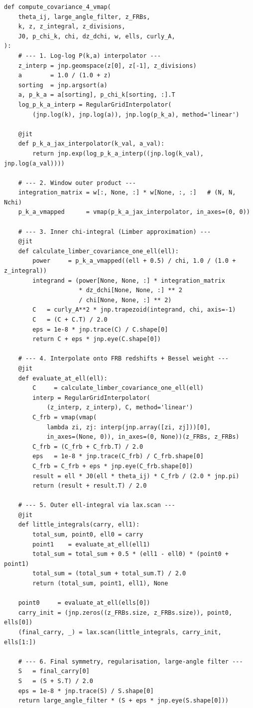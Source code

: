 \begin{lstlisting}[style=python, caption={Angular covariance via Limber approximation.}]
def compute_covariance_4_vmap(
    theta_ij, large_angle_filter, z_FRBs,
    k, z, z_integral, z_divisions,
    J0, p_chi_k, chi, dz_dchi, w, ells, curly_A,
):
    # --- 1. Log-log P(k,a) interpolator ---
    z_interp = jnp.geomspace(z[0], z[-1], z_divisions)
    a        = 1.0 / (1.0 + z)
    sorting  = jnp.argsort(a)
    a, p_k_a = a[sorting], p_chi_k[sorting, :].T
    log_p_k_a_interp = RegularGridInterpolator(
        (jnp.log(k), jnp.log(a)), jnp.log(p_k_a), method='linear')

    @jit
    def p_k_a_jax_interpolator(k_val, a_val):
        return jnp.exp(log_p_k_a_interp((jnp.log(k_val), jnp.log(a_val))))

    # --- 2. Window outer product ---
    integration_matrix = w[:, None, :] * w[None, :, :]   # (N, N, Nchi)
    p_k_a_vmapped      = vmap(p_k_a_jax_interpolator, in_axes=(0, 0))

    # --- 3. Inner chi-integral (Limber approximation) ---
    @jit
    def calculate_limber_covariance_one_ell(ell):
        power     = p_k_a_vmapped((ell + 0.5) / chi, 1.0 / (1.0 + z_integral))
        integrand = (power[None, None, :] * integration_matrix
                     * dz_dchi[None, None, :] ** 2
                     / chi[None, None, :] ** 2)
        C   = curly_A**2 * jnp.trapezoid(integrand, chi, axis=-1)
        C   = (C + C.T) / 2.0
        eps = 1e-8 * jnp.trace(C) / C.shape[0]
        return C + eps * jnp.eye(C.shape[0])

    # --- 4. Interpolate onto FRB redshifts + Bessel weight ---
    @jit
    def evaluate_at_ell(ell):
        C     = calculate_limber_covariance_one_ell(ell)
        interp = RegularGridInterpolator(
            (z_interp, z_interp), C, method='linear')
        C_frb = vmap(vmap(
            lambda zi, zj: interp(jnp.array([zi, zj]))[0],
            in_axes=(None, 0)), in_axes=(0, None))(z_FRBs, z_FRBs)
        C_frb = (C_frb + C_frb.T) / 2.0
        eps   = 1e-8 * jnp.trace(C_frb) / C_frb.shape[0]
        C_frb = C_frb + eps * jnp.eye(C_frb.shape[0])
        result = ell * J0(ell * theta_ij) * C_frb / (2.0 * jnp.pi)
        return (result + result.T) / 2.0

    # --- 5. Outer ell-integral via lax.scan ---
    @jit
    def little_integrals(carry, ell1):
        total_sum, point0, ell0 = carry
        point1    = evaluate_at_ell(ell1)
        total_sum = total_sum + 0.5 * (ell1 - ell0) * (point0 + point1)
        total_sum = (total_sum + total_sum.T) / 2.0
        return (total_sum, point1, ell1), None

    point0     = evaluate_at_ell(ells[0])
    carry_init = (jnp.zeros((z_FRBs.size, z_FRBs.size)), point0, ells[0])
    (final_carry, _) = lax.scan(little_integrals, carry_init, ells[1:])

    # --- 6. Final symmetry, regularisation, large-angle filter ---
    S   = final_carry[0]
    S   = (S + S.T) / 2.0
    eps = 1e-8 * jnp.trace(S) / S.shape[0]
    return large_angle_filter * (S + eps * jnp.eye(S.shape[0]))
\end{lstlisting}

